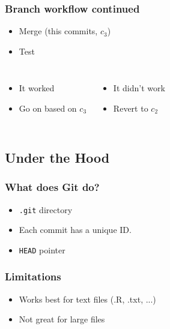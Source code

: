 \documentclass{beamer}
\begin{document}
\begin{frame}[fragile]
    \frametitle{Branch workflow continued}
    \begin{itemize}
        \item Merge (this commits, $c_3$)
        \item Test
    \end{itemize}
    \begin{columns}
        \begin{itemize}
        \item It worked
        \item Go on based on $c_3$
        \end{itemize}
        \begin{itemize}
            \item It didn't work
            \item Revert to $c_2$
        \end{itemize}
    \end{columns}
\end{frame}

\subsection{Under the Hood}

\begin{frame}[fragile]
    \frametitle{What does Git do?}
    \begin{itemize}
        \item \verb|.git| directory
        \item Each commit has a unique ID. 
        \item \verb|HEAD| pointer
    \end{itemize}
\end{frame}

\begin{frame}
    \frametitle{Limitations}
    \begin{itemize}
        \item Works best for text files (.R, .txt, ...)
        \item Not great for large files 
    \end{itemize}
\end{frame}
\end{document}
